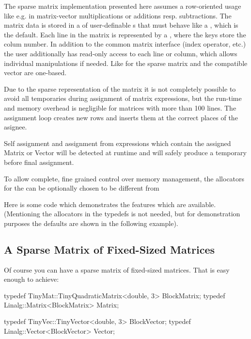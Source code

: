 The sparse matrix implementation presented here assumes a row-oriented usage
like e.g. in matrix-vector multiplications or additions resp. subtractions. The
matrix data is stored in a  of user-definable
s that must behave like a ,
which is the default. Each line in the matrix is represented by a
, where the keys store the colum number.  In addition to
the common matrix interface (index operator, etc.) the user additionally has
read-only access to each line or column, which allows individual manipulations
if needed.  Like for  the sparse matrix and the compatible
vector are one-based.

Due to the sparse representation of the matrix it is not completely possible to
avoid all temporaries during assignment of matrix expressions, but the run-time
and memory overhead is negligible for matrices with more than 100 lines. The
assignment loop creates new rows and inserts them at the correct places of the
asignee. 

Self assignment and assignment from expressions which contain the
assigned Matrix or Vector will be detected at runtime and will safely produce a
temporary before final assignment. 

To allow complete, fine grained control over memory management, the allocators
for the  can be optionally chosen to be different from

Here is some code which demonstrates the features which are available.
(Mentioning the allocators in the typedefs is not needed, but for demonstration
purposes the defaults are shown in the following example).




\subsection{A Sparse Matrix of Fixed-Sized Matrices}
\label{A Sparse Matrix of Fixed-Sized Matrices}

Of course you can have a sparse matrix of fixed-sized matrices. That is easy
enough to achieve: 

\begin{code}
  typedef TinyMat::TinyQuadraticMatrix<double, 3> BlockMatrix;
  typedef Linalg::Matrix<BlockMatrix> Matrix;

  typedef TinyVec::TinyVector<double, 3> BlockVector;
  typedef Linalg::Vector<BlockVector> Vector;
\end{code}


